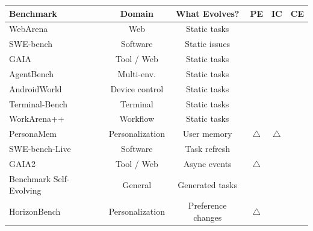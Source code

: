 \documentclass{llmxive}
\providecommand{\cmark}{\ding{51}}
\providecommand{\xmark}{\ding{55}}
\providecommand{\pmark}{\textbf{$\triangle$}}
\providecommand{\arraystretch}{1.05}
\begin{document}
\begin{table}[t]
\centering
\small
\setlength{\tabcolsep}{4pt}
\renewcommand{\arraystretch}{1.05}
\begin{tabular}{lccccc}
\toprule
\textbf{Benchmark} 
& \textbf{Domain} 
& \textbf{What Evolves?} 
& \textbf{PE} 
& \textbf{IC} 
& \textbf{CE} \\
\midrule

WebArena \cite{zhou2023webarena}
& Web
& Static tasks
& \xmark
& \xmark
& \xmark \\

SWE-bench \cite{jimenez2024swebench}
& Software
& Static issues
& \xmark
& \xmark
& \xmark \\

GAIA \cite{mialon2024gaia}
& Tool / Web
& Static tasks
& \xmark
& \xmark
& \xmark \\

AgentBench \cite{liu2024agentbench}
& Multi-env.
& Static tasks
& \xmark
& \xmark
& \xmark \\

AndroidWorld \cite{rawles2025androidworld}
& Device control
& Static tasks
& \xmark
& \xmark
& \xmark \\

Terminal-Bench \cite{terminal-bench}
& Terminal
& Static tasks
& \xmark
& \xmark
& \xmark \\

WorkArena++ \cite{workarena++}
& Workflow
& Static tasks
& \xmark
& \xmark
& \xmark \\

PersonaMem \cite{jiang2025personamem}
& Personalization
& User memory
& \pmark
& \pmark
& \xmark \\

SWE-bench-Live \cite{li2026swe-benchl-ive}
& Software
& Task refresh
& \xmark
& \xmark
& \xmark \\

GAIA2 \cite{gaia2}
& Tool / Web
& Async events
& \pmark
& \cmark
& \xmark \\

Benchmark Self-Evolving \cite{benchmark-selfevolv}
& General
& Generated tasks
& \xmark
& \xmark
& \xmark \\

HorizonBench \cite{li2026horizonbench}
& Personalization
& Preference changes
& \pmark
& \cmark
& \xmark \\


\end{tabular}
\end{table}
\end{document}
